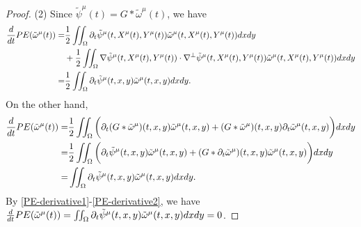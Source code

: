 \documentclass[1 [leqno, 11pt]{amsart}
\numberwithin{equation}{section}
\begin{document}
\begin{CJK*}{GBK}{song}
\begin{appendix}
\begin{proof}
(2) Since $\tilde \psi^\mu(t)=G*\tilde \omega^\mu(t)$, we have
\begin{align}\nonumber
{d\over dt}PE(\tilde \omega^\mu(t))=&{1\over2}\iint_{\Omega}\partial_t\tilde \psi^\mu(t,X^\mu(t),Y^\mu(t))\tilde \omega^{\mu}(t,X^\mu(t),Y^\mu(t) )dxdy\\\nonumber
&+{1\over2}\iint_{\Omega}\nabla\tilde \psi^\mu(t, X^\mu(t),Y^\mu(t) )\cdot\nabla^\bot\tilde \psi^\mu(t,X^\mu(t),Y^\mu(t))\tilde \omega^{\mu}(t,X^\mu(t),Y^\mu(t) ) dxdy\\
=&{1\over2}\iint_{\Omega}\partial_t\tilde \psi^\mu(t,x,y)\tilde \omega^{\mu}(t,x,y )dxdy.\label{PE-derivative1}
\end{align}
On  the other hand,
\begin{align}\nonumber
{d\over dt}PE(\tilde \omega^\mu(t))=&{1\over2}\iint_{\Omega}\bigg(\partial_t(G*\tilde \omega^\mu)(t,x,y)\tilde \omega^{\mu}(t,x,y )+(G*\tilde \omega^\mu)(t,x,y)\partial_t\tilde \omega^{\mu}(t,x,y )\bigg)dxdy\\\nonumber
=&{1\over2}\iint_{\Omega}\bigg(\partial_t\tilde \psi^\mu(t,x,y)\tilde \omega^{\mu}(t,x,y )+(G*\partial_t\tilde \omega^\mu)(t,x,y)\tilde \omega^{\mu}(t,x,y )\bigg)dxdy\\
=&\iint_{\Omega}\partial_t\tilde \psi^\mu(t,x,y)\tilde \omega^{\mu}(t,x,y )dxdy.\label{PE-derivative2}
\end{align}
By \eqref{PE-derivative1}-\eqref{PE-derivative2}, we have ${d\over dt}PE(\tilde \omega^\mu(t))=\iint_{\Omega}\partial_t\tilde \psi^\mu(t,x,y)\tilde \omega^{\mu}(t,x,y )dxdy=0$.
\end{proof}


\end{appendix}
\end{CJK*}
\end{document}
